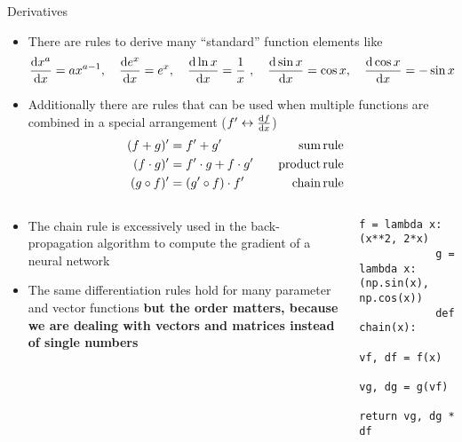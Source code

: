   \begin{frame}[fragile]{Derivatives}
    \begin{itemize}
      \item There are rules to derive many \enquote{standard} function elements like
      \begin{equation*}
        \dderiv{x^a}{x} = ax^{a-1} ,\quad \dderiv{e^x}{x} = e^x ,\quad \dderiv{\ln x}{x} = \frac{1}{x} ,\quad \dderiv{\sin x}{x} = \cos{x} ,\quad \dderiv{\cos x}{x} = -\sin x
      \end{equation*}
      \item Additionally there are rules that can be used when multiple functions are combined in a special arrangement ($f' \leftrightarrow \frac{\mathrm{d}f}{\mathrm{d}x}$)
      \begin{align*}
        (f + g)' &= f' + g' &\quad\text{sum\,rule}\quad \\
        (f \cdot g)' &= f' \cdot g + f \cdot g' &\quad\text{product\,rule}\quad \\
        (g \circ f)' &= (g' \circ f) \cdot f' &\quad\text{chain\,rule}\quad
      \end{align*}
    \end{itemize}
    \begin{columns}[t]
      \begin{column}{0.55\textwidth}
        \begin{itemize}
          \item The chain rule is excessively used in the back-propagation algorithm to compute the gradient of a neural network
          \item The same differentiation rules hold for many parameter and vector functions \textbf{but the order matters, because we are dealing with vectors and matrices instead of single numbers}
        \end{itemize}
      \end{column}
      \begin{column}{0.45\textwidth}
        \begin{mdframed}
          \begin{lstlisting}[style=dark, gobble=12, title=\lsttitlelight{Chaining gradients in Python}]
            f = lambda x: (x**2, 2*x)
            g = lambda x: (np.sin(x), np.cos(x))
            def chain(x):
                vf, df = f(x)
                vg, dg = g(vf)
                return vg, dg * df
          \end{lstlisting}
        \end{mdframed}
      \end{column}
    \end{columns}
  \end{frame}


